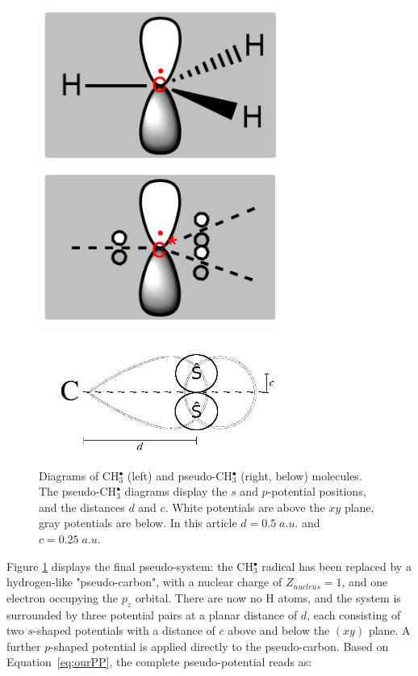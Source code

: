 \documentclass[aip,reprint]{revtex4-1}
\begin{document}
\begin{figure}
\begin{center}
\includegraphics[width=8cm]{ch3.png}
\includegraphics[width=8cm]{pseudoch3.png}
\includegraphics[width=8cm]{tm_sp2_potentials.png}
\end{center}
\caption{Diagrams of CH\(^{\bullet}_{3}\) (left) and pseudo-CH\(^{\bullet}_{3}\)
(right, below) molecules.
The pseudo-CH\(^{\bullet}_{3}\) diagrams display the \(s\) and \(p\)-potential positions,
and the distances \(d\) and \(c\). White potentials are above the $xy$ plane, 
gray potentials are below.
In this article $d=0.5\;a.u.$ and $c=0.25\;a.u.$}
\label{figure:ref_pseudo_diagram}
\end{figure}

Figure \ref{figure:ref_pseudo_diagram} displays the final pseudo-system: the CH\(^{\bullet}_{3}\) radical has been replaced by
a hydrogen-like "pseudo-carbon", with a nuclear charge of \(Z_{nucleus} = 1\), and one electron occupying the \(p_{z}\) orbital. 
There are now no H atoms, and the system is surrounded by three potential pairs at a planar distance of \(d\), each consisting of 
two \(s\)-shaped potentials with a distance of \(c\) above and below the \((xy)\) plane. 
A further \(p\)-shaped potential is applied directly to the pseudo-carbon.
Based on Equation~\ref{eq:ourPP}, the complete pseudo-potential reads as:
\end{document}

